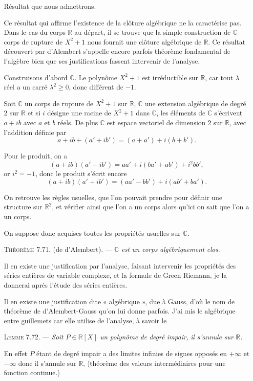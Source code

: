 Résultat que nous admettrons.

Ce résultat qui affirme l'existence de la clôture algébrique ne la caractérise pas. Dans le cas du corps $\mathbb R$ au départ, il se trouve que la simple construction de $\mathbb C$ corps de rupture de $X^2+1$ nous fournit une clôture algébrique de $\mathbb R$. Ce résultat découvert par d'Alembert s'appelle encore parfois théorème fondamental de l'algèbre bien que ses justifications fassent intervenir de l'analyse.

Construisons d'abord $\mathbb C$. Le polynôme $X^2+1$ est irréductible sur $\mathbb R$, car tout $\lambda$ réel a un carré $\lambda^2\ge0$, donc différent de $-1$.

Soit $\mathbb C$ un corps de rupture de $X^2+1$ sur $\mathbb R$, $\mathbb C$  une extension algébrique de degré 2 sur $\mathbb R$ et si $i$ désigne une racine de $X^2+1$ dans $\mathbb C$, les éléments de $\mathbb C$ s'écrivent $a+ib$ avec $a$ et $b$ réels. De plus $\mathbb C$ est espace vectoriel de dimension 2 sur $\mathbb R$, avec l'addition définie par
\[
a+ib+(a'+ib')=(a+a')+i(b+b').
\]

Pour le produit, on a
\[
(a+ib)(a'+ib')=aa'+i(ba'+ab')+i^2bb',
\]
or $i^2=-1$, donc le produit s'écrit encore
\[
(a+ib)(a'+ib')=(aa'-bb')+i(ab'+ba').
\]

On retrouve les règles usuelles, que l'on pouvait prendre pour définir une structure sur $\mathbb R^2$, et vérifier ainsi que l'on a un corps alors qu'ici on sait que l'on a un corps.

On suppose donc acquises toutes les propriétés usuelles sur $\mathbb C$.

\medskip\noindent\textsc{Théorème 7.71.} (de d'Alembert). --- \emph{$\mathbb C$ est un corps algébriquement clos.}

Il en existe une justification par l'analyse, faisant intervenir les propriétés des séries entières de variable complexe, et la formule de Green Riemann, je la donnerai après l'étude des séries entières.

Il en existe une justification dite « algébrique », due à Gauss, d'où le nom de théorème de d'Alembert-Gauss qu'on lui donne parfois. J'ai mis le algébrique entre guillemets car elle utilise de l'analyse, à savoir le

\medskip\noindent\textsc{Lemme 7.72.} --- \emph{Soit $P\in\mathbb R[X]$ un polynôme de degré impair, il s'annule sur $\mathbb R$.}

En effet $P$ étant de degré impair a des limites infinies de signes opposés en $+\infty$ et $-\infty$ donc il s'annule sur $\mathbb R$, (théorème des valeurs intermédiaires pour une fonction continue.) \bookend

